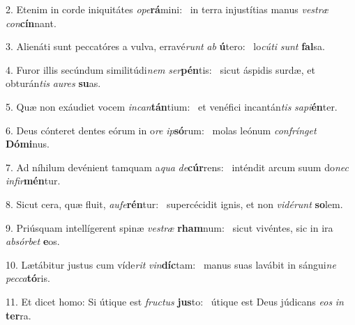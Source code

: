 2. Etenim in corde iniquitátes \textit{o}\textit{pe}\textbf{rá}mini: \ast\  in terra injustítias manus \textit{ves}\textit{træ} \textit{con}\textbf{cín}nant.\

3. Alienáti sunt peccatóres a vulva, erravé\textit{runt} \textit{ab} \textbf{ú}tero: \ast\  lo\textit{cú}\textit{ti} \textit{sunt} \textbf{fal}sa.\

4. Furor illis secúndum similitúdi\textit{nem} \textit{ser}\textbf{pén}tis: \ast\  sicut áspidis surdæ, et obturán\textit{tis} \textit{au}\textit{res} \textbf{su}as.\

5. Quæ non exáudiet vocem \textit{in}\textit{can}\textbf{tán}tium: \ast\  et venéfici incantán\textit{tis} \textit{sa}\textit{pi}\textbf{én}ter.\

6. Deus cónteret dentes eórum in o\textit{re} \textit{ip}\textbf{só}rum: \ast\  molas leónum \textit{con}\textit{frín}\textit{get} \textbf{Dó}\textbf{mi}nus.\

7. Ad níhilum devénient tamquam a\textit{qua} \textit{de}\textbf{cúr}rens: \ast\  inténdit arcum suum do\textit{nec} \textit{in}\textit{fir}\textbf{mén}tur.\

8. Sicut cera, quæ fluit, \textit{au}\textit{fe}\textbf{rén}tur: \ast\  supercécidit ignis, et non \textit{vi}\textit{dé}\textit{runt} \textbf{so}lem.\

9. Priúsquam intellígerent spinæ \textit{ves}\textit{træ} \textbf{rham}num: \ast\  sicut vivéntes, sic in ira \textit{ab}\textit{sór}\textit{bet} \textbf{e}os.\

10. Lætábitur justus cum víde\textit{rit} \textit{vin}\textbf{díc}tam: \ast\  manus suas lavábit in sángui\textit{ne} \textit{pec}\textit{ca}\textbf{tó}ris.\

11. Et dicet homo: Si útique est \textit{fruc}\textit{tus} \textbf{jus}to: \ast\  útique est Deus júdicans \textit{e}\textit{os} \textit{in} \textbf{ter}ra.\

